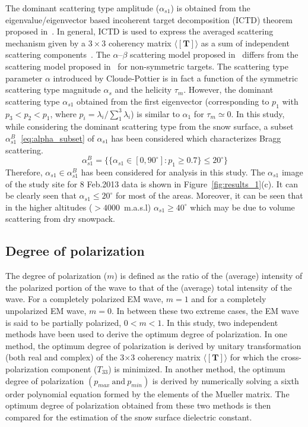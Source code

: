 The dominant scattering type amplitude ($\alpha_{s1}$) is obtained from the eigenvalue/eigenvector based incoherent target decomposition (ICTD) theorem proposed in~\cite{TOUZI2007}. In general, ICTD is used to express the averaged scattering mechanism given by a $3\times3$ coherency matrix $\langle[{\mathbf{T}}]\rangle$ as a sum of independent scattering components~\citep{Cloude92NATO,Cloude96,TOUZI2007}. The $\alpha$--$\beta$ scattering model proposed in~\cite{Cloude96} differs from the scattering model proposed in~\cite{TOUZI2007} for non-symmetric targets. The scattering type parameter $\alpha$ introduced by Cloude-Pottier is in fact a function of the symmetric scattering type magnitude $\alpha_{s}$ and the helicity $\tau_{m}$. However, the dominant scattering type $\alpha_{s1}$ obtained from the first eigenvector (corresponding to $p_{1}$ with $p_{3}<p_{2}<p_{1}$, where $p_{i}=\lambda_{i}/\sum_{1}^{3}\lambda_{i}$) is similar to $\alpha_{1}$ for $\tau_{m}\simeq0$. In this study, while considering the dominant scattering type from the snow surface, a subset $\alpha_{s1}^{B}$~\eqref{eq:alpha_subset} of $\alpha_{s1}$ has been considered which characterizes Bragg scattering. 
\begin{equation}
\alpha_{s1}^{B}=\Big\{\{\alpha_{s1} \in [0,90^\circ]: p_{1}\ge 0.7\} \le 20^\circ\Big\}
\label{eq:alpha_subset}
\end{equation}
Therefore, $\alpha_{s1} \in \alpha_{s1}^{B}$ has been considered for analysis in this study. The $\alpha_{s1}$ image of the study site for 8 Feb.2013 data is shown in Figure~\ref{fig:results_1}(c). It can be clearly seen that $\alpha_{s1} \le 20^\circ$ for most of the areas. Moreover, it can be seen that in the higher altitudes ($> 4000$~m.a.s.l) $\alpha_{s1} \ge 40^\circ$ which may be due to volume scattering from dry snowpack. 

\subsection{Degree of polarization}
The degree of polarization ($m$) is defined as the ratio of the (average) intensity of the polarized portion of the wave to that of the (average) total intensity of the wave. For a completely polarized EM wave, $m = 1$ and for a completely unpolarized EM wave, $m = 0$. In between these two extreme cases, the EM wave is said to be partially polarized, $0 < m < 1$. In this study, two independent methods have been used to derive the optimum degree of polarization. In one method, the optimum degree of polarization is derived by unitary transformation (both real and complex) of the 3$\times$3 coherency matrix $\mathbf{\langle[T]\rangle}$ for which the cross-polarization component ($T_{33}$) is minimized. In another method, the optimum degree of polarization $(p_{max}~\mbox{and}~p_{min})$ is derived by numerically solving a sixth order polynomial equation formed by the elements of the Mueller matrix. The optimum degree of polarization obtained from these two methods is then compared for the estimation of the snow surface dielectric constant. 

